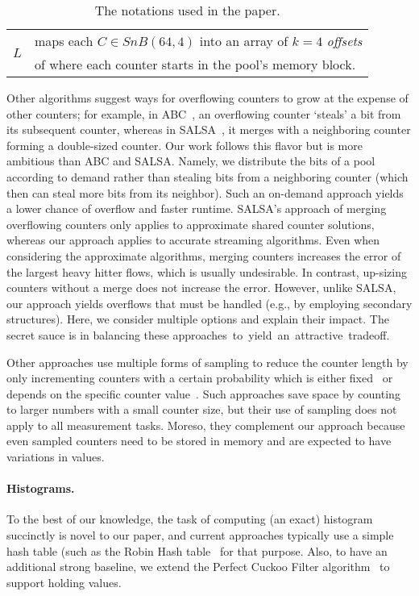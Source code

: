 \begin{table}[t]
{\begin{tabular}{|c||l|}
\multirow{2}{*}{$L$} & maps each $C\in SnB(64,4)$ into an array of $k=4$ \emph{offsets}\\ & of where each counter starts in the pool's memory block.                                                    \\ \hline
\end{tabular}
}
\vspace{0mm}
\caption{The notations used in the paper.}\label{tbl:notations}
\vspace{-4mm}
\end{table}

Other algorithms suggest ways for overflowing counters to grow at the expense of other counters; for example, in ABC~\cite{gong2017abc}, an overflowing counter `steals' a bit from its subsequent counter, whereas in SALSA~\cite{SALSA}, it merges with a neighboring counter forming a double-sized counter. Our work follows this flavor but is more ambitious than ABC and SALSA. Namely, we distribute the bits of a pool according to demand rather than stealing bits from a neighboring counter (which then can steal more bits from its neighbor). Such an on-demand approach yields a lower chance of overflow and faster runtime. SALSA's approach of merging overflowing counters only applies to approximate shared counter solutions, whereas our approach applies to accurate streaming algorithms. Even when considering the approximate algorithms, merging counters increases the error of the largest heavy hitter flows, which is usually undesirable.
In contrast,  up-sizing counters without a merge does not increase the error. However, unlike SALSA, our approach yields overflows that must be handled (e.g., by employing secondary structures). Here, we consider multiple options and explain their impact. The secret sauce is in balancing these \mbox{approaches to yield an attractive tradeoff. }

Other approaches use multiple forms of sampling to reduce the counter length by only incrementing counters with a certain probability which is either fixed~\cite{AEE} or depends on the specific counter value~\cite{CEDAR,ANLSUpscaling,ApproximateCounting}. Such approaches save space by counting to larger numbers with a small counter size, but their use of sampling does not apply to all measurement tasks. Moreso, they complement our approach because even sampled counters need to be stored in memory and are expected to have variations in values.

\paragraph{\textbf{Histograms.}} To the best of our knowledge, the task of computing (an exact) histogram succinctly is novel to our paper, and current approaches typically use a simple hash table (such as the Robin Hash table~\cite{RobinMap} for that purpose. Also, to have an additional strong baseline, we extend the Perfect Cuckoo Filter algorithm~\cite{reviriego2021perfect} to support holding values.